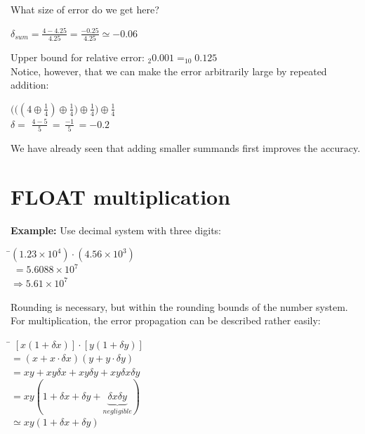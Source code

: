 \documentclass[a4paper,12pt]{report}
\begin{document}
	What size of error do we get here?

\begin{center}
	\large{$\delta_{sum}=\frac{4-4.25}{4.25}=\frac{-0.25}{4.25}\simeq -0.06$}
\end{center}

	\medskip
	Upper bound for relative error: $_2 0.001 = _{10}0.125$\\

	Notice, however, that we can make the error arbitrarily large by repeated addition:

\begin{center}
	$\bigg(\Big(\left(4 \oplus \frac{1}{4}\right)\oplus \frac{1}{4}\Big)\oplus \frac{1}{4}\bigg)\oplus \frac{1}{4}$\\
	\medskip
	\large{$\delta =$ \Large{$\frac{4-5}{5}$}$\,=\,$\Large{$\frac{-1}{5}$}$\,=-0.2$}\\
\end{center}
	\medskip

	We have already seen that adding smaller summands first improves the accuracy.

\section{FLOAT multiplication}

	\noindent \textbf{Example:} Use decimal system with three digits:

\begin{tabbing}
	\hspace*{5cm} \=$(1.23 \times 10^4)\cdot(4.56 \times 10^3)$\\
	\> $\;=5.6088 \times 10^7$\\
	\> $\Rightarrow 5.61 \times 10^7$
\end{tabbing}

	Rounding is necessary, but within the rounding bounds of the number system.  For multiplication, 
	the error propagation can be described rather easily:

\begin{tabbing}
	\hspace*{5cm}\= $[x(1+\delta x)]\cdot[y(1+\delta y)]$\\
	\>$= (x+x\cdot\delta x)(y+y\cdot\delta y)$\\
	\>$= xy + xy\delta x + xy\delta y + xy \delta x \delta y$\\
	\> $= xy(1 + \delta x + \delta y + \!\!\!\underbrace{\delta x \delta y}_{negligible}\!\!\!)$\\
	\> $\simeq xy(1+ \delta x + \delta y)$
\end{tabbing}
\end{document}
